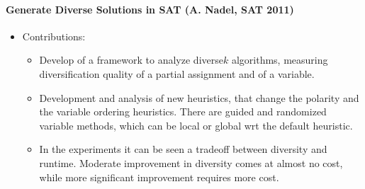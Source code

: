 
\newpage
\paragraph{Generate Diverse Solutions in SAT (A. Nadel, SAT 2011)}

\begin{itemize}
\item
    Contributions:
    \begin{itemize}
    \item
        Develop of a framework to analyze diverse$k$ algorithms, 
        measuring diversification quality of a partial assignment and of a variable.
    \item
        Development and analysis of new heuristics, 
        that change the polarity and the variable ordering heuristics.
        There are guided and randomized variable methods, 
        which can be local or global wrt the default heuristic.
    \item
        In the experiments it can be seen a tradeoff between diversity and runtime.
        Moderate improvement in diversity comes at almost no cost, 
        while more significant improvement requires more cost.
    

\end{itemize}
\end{itemize}

